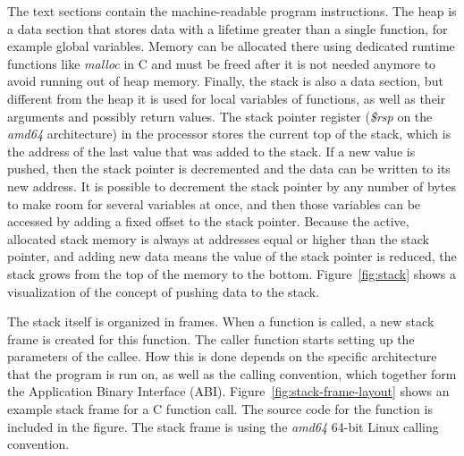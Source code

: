 The text sections contain the machine-readable program instructions.
The heap is a data section that stores data with a lifetime greater than a single function, for example global
variables.
Memory can be allocated there using dedicated runtime functions like \textit{malloc} in C and must be freed after it is
not needed anymore to avoid running out of heap memory.
Finally, the stack is also a data section, but different from the heap it is used for local variables of functions, as
well as their arguments and possibly return values.
The stack pointer register (\textit{\$rsp} on the \textit{amd64} architecture) in the processor stores the current top
of the stack, which is the address of the last value that was added to the stack.
If a new value is pushed, then the stack pointer is decremented and the data can be written to its new address.
It is possible to decrement the stack pointer by any number of bytes to make room for several variables at once, and
then those variables can be accessed by adding a fixed offset to the stack pointer.
Because the active, allocated stack memory is always at addresses equal or higher than the stack pointer, and adding
new data means the value of the stack pointer is reduced, the stack grows from the top of the memory to the bottom.
Figure~\ref{fig:stack} shows a visualization of the concept of pushing data to the stack.



The stack itself is organized in frames.
When a function is called, a new stack frame is created for this function.
The caller function starts setting up the parameters of the callee.
How this is done depends on the specific architecture that the program is run on, as well as the calling convention,
which together form the Application Binary Interface (\acrshort{ABI}).
Figure~\ref{fig:stack-frame-layout} shows an example stack frame for a C function call.
The source code for the function is included in the figure.
The stack frame is using the \textit{amd64} 64-bit Linux calling convention.

